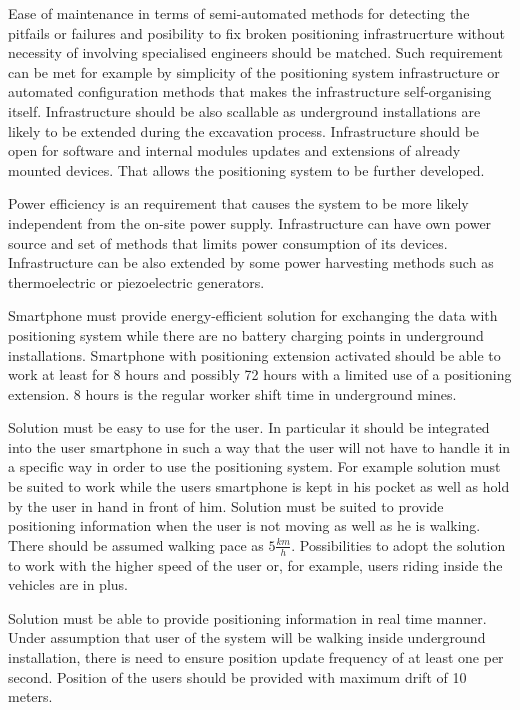 \documentclass[../main.tex]{subfiles}
\begin{document}
Ease of maintenance in terms of semi-automated methods for detecting the pitfails or failures and posibility to fix broken positioning infrastrucrture without necessity of involving specialised engineers should be matched. Such requirement can be met for example by simplicity of the positioning system infrastructure or automated configuration methods that makes the infrastructure self-organising itself. Infrastructure should be also scallable as underground installations are likely to be extended during the excavation process. Infrastructure should be open for software and internal modules updates and extensions of already mounted devices. That allows the positioning system to be further developed.

Power efficiency is an requirement that causes the system to be more likely independent from the on-site power supply. Infrastructure can have own power source and set of methods that limits power consumption of its devices. Infrastructure can be also extended by some power harvesting methods such as thermoelectric or piezoelectric generators.

Smartphone must provide energy-efficient solution for exchanging the data with positioning system while there are no battery charging points in underground installations. Smartphone with positioning extension activated should be able to work at least for 8 hours and possibly 72 hours with a limited use of a positioning extension. 8 hours is the regular worker shift time in underground mines.

Solution must be easy to use for the user. In particular it should be integrated into the user smartphone in such a way that the user will not have to handle it in a specific way in order to use the positioning system. For example solution must be suited to work while the users smartphone is kept in his pocket as well as hold by the user in hand in front of him. Solution must be suited to provide positioning information when the user is not moving as well as he is walking. There should be assumed walking pace as $5 \frac{km}{h}$. Possibilities to adopt the solution to work with the higher speed of the user or, for example, users riding inside the vehicles are in plus.

Solution must be able to provide positioning information in real time manner. Under assumption that user of the system will be walking inside underground installation, there is need to ensure position update frequency of at least one per second. Position of the users should be provided with maximum drift of 10 meters.
\end{document}
